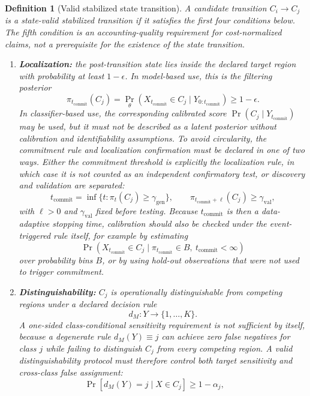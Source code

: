 \documentclass[11pt,a4paper]{article}
\newtheorem{definition}{Definition}
\newcommand{\1}{\mathbf{1}}
\begin{document}
\begin{definition}[Valid stabilized state transition]
A candidate transition $C_i \to C_j$ is a state-valid stabilized transition if it satisfies the first four conditions below. The fifth condition is an accounting-quality requirement for cost-normalized claims, not a prerequisite for the existence of the state transition.

\begin{enumerate}
  \item \textbf{Localization:} the post-transition state lies inside the declared target region with probability at least $1-\epsilon$. In model-based use, this is the filtering posterior
  \[
    \pi_{t_{\mathrm{commit}}}(C_j)
    =
    \Pr_\theta(X_{t_{\mathrm{commit}}}\in C_j\mid Y_{0:t_{\mathrm{commit}}})
    \geq 1-\epsilon.
  \]
  In classifier-based use, the corresponding calibrated score $\Pr(C_j\mid Y_{t_{\mathrm{commit}}})$ may be used, but it must not be described as a latent posterior without calibration and identifiability assumptions.
  To avoid circularity, the commitment rule and localization confirmation must be declared in one of two ways. Either the commitment threshold is explicitly the localization rule, in which case it is not counted as an independent confirmatory test, or discovery and validation are separated:
  \[
    t_{\mathrm{commit}}=\inf\{t:\pi_t(C_j)\geq\gamma_{\mathrm{gen}}\},
    \qquad
    \pi_{t_{\mathrm{commit}}+\ell}(C_j)\geq \gamma_{\mathrm{val}},
  \]
  with $\ell>0$ and $\gamma_{\mathrm{val}}$ fixed before testing.
  Because $t_{\mathrm{commit}}$ is then a data-adaptive stopping time, calibration should also be checked under the event-triggered rule itself, for example by estimating
  \[
    \Pr(X_{t_{\mathrm{commit}}}\in C_j
    \mid \pi_{t_{\mathrm{commit}}}\in B,\ t_{\mathrm{commit}}<\infty)
  \]
  over probability bins $B$, or by using hold-out observations that were not used to trigger commitment.
  \item \textbf{Distinguishability:} $C_j$ is operationally distinguishable from competing regions under a declared decision rule
  \[
    d_M:Y\rightarrow\{1,\ldots,K\}.
  \]
  A one-sided class-conditional sensitivity requirement is not sufficient by itself, because a degenerate rule $d_M(Y)\equiv j$ can achieve zero false negatives for class $j$ while failing to distinguish $C_j$ from every competing region. A valid distinguishability protocol must therefore control both target sensitivity and cross-class false assignment:
  \[
    \Pr[d_M(Y)=j\mid X\in C_j]\geq 1-\alpha_j,
    \qquad
\]
\end{enumerate}
\end{definition}
\end{document}
